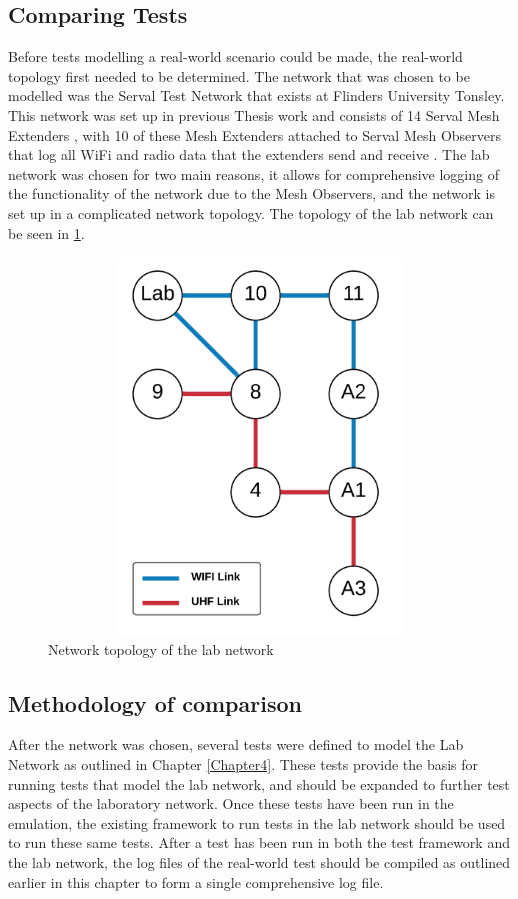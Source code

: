 \subsection{Comparing Tests}
Before tests modelling a real-world scenario could be made, the real-world topology first needed to be determined.
The network that was chosen to be modelled was the Serval Test Network that exists at Flinders University Tonsley.
This network was set up in previous Thesis work and consists of 14 Serval Mesh Extenders \parencite{wade_2019}, with 10 of these Mesh Extenders attached to Serval Mesh Observers that log all WiFi and radio data that the extenders send and receive \parencite{lancaster_2019}.
The lab network was chosen for two main reasons, it allows for comprehensive logging of the functionality of the network due to the Mesh Observers, and the network is set up in a complicated network topology.
The topology of the lab network can be seen in \figurename{ \ref{fig:chapter6LabNetwork}}.

\begin{figure}
    \begin{centering}
        \includegraphics[width=15cm,height=10cm,keepaspectratio]{Figures/Chapter6-LabTopology.png}
        \caption{Network topology of the lab network}
        \label{fig:chapter6LabNetwork}
    \end{centering}
\end{figure}


\subsection{Methodology of comparison}
After the network was chosen, several tests were defined to model the Lab Network as outlined in Chapter \ref{Chapter4}.
These tests provide the basis for running tests that model the lab network, and should be expanded to further test aspects of the laboratory network.
Once these tests have been run in the emulation, the existing framework to run tests in the lab network should be used to run these same tests.
After a test has been run in both the test framework and the lab network, the log files of the real-world test should be compiled as outlined earlier in this chapter to form a single comprehensive log file.

